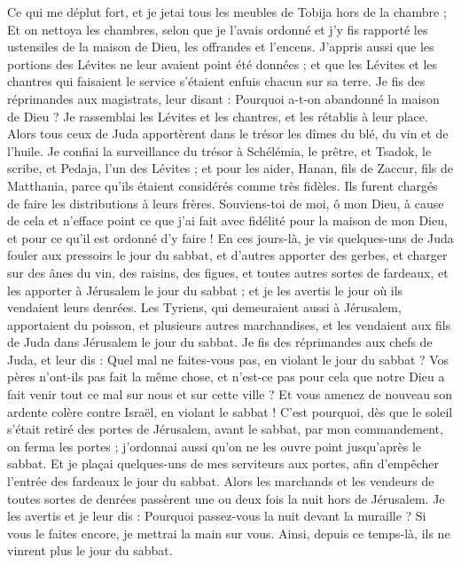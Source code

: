 \begin{multicols}{2}
Ce qui me déplut fort, et je jetai tous les meubles de Tobija hors de la chambre ;
Et on nettoya les chambres, selon que je l'avais ordonné et j'y fis rapporté les ustensiles de la maison de Dieu, les offrandes et l'encens.
J'appris aussi que les portions des Lévites ne leur avaient point été données ; et que les Lévites et les chantres qui faisaient le service s'étaient enfuis chacun sur sa terre.
Je fis des réprimandes aux magistrats, leur disant : Pourquoi a-t-on abandonné la maison de Dieu ? Je rassemblai les Lévites et les chantres, et les rétablis à leur place.
Alors tous ceux de Juda apportèrent dans le trésor les dîmes du blé, du vin et de l'huile.
Je confiai la surveillance du trésor à Schélémia, le prêtre, et Tsadok, le scribe, et Pedaja, l'un des Lévites ; et pour les aider, Hanan, fils de Zaccur, fils de Matthania, parce qu'ils étaient considérés comme très fidèles. Ils furent chargés de faire les distributions à leurs frères.
Souviens-toi de moi, ô mon Dieu, à cause de cela et n'efface point ce que j'ai fait avec fidélité pour la maison de mon Dieu, et pour ce qu'il est ordonné d'y faire !
En ces jours-là, je vis quelques-uns de Juda fouler aux pressoirs le jour du sabbat, et d'autres apporter des gerbes, et charger sur des ânes du vin, des raisins, des figues, et toutes autres sortes de fardeaux, et les apporter à Jérusalem le jour du sabbat ; et je les avertis le jour où ils vendaient leurs denrées.
Les Tyriens, qui demeuraient aussi à Jérusalem, apportaient du poisson, et plusieurs autres marchandises, et les vendaient aux fils de Juda dans Jérusalem le jour du sabbat.
Je fis des réprimandes aux chefs de Juda, et leur dis : Quel mal ne faites-vous pas, en violant le jour du sabbat ?
Vos pères n'ont-ils pas fait la même chose, et n'est-ce pas pour cela que notre Dieu a fait venir tout ce mal sur nous et sur cette ville ? Et vous amenez de nouveau son ardente colère contre Israël, en violant le sabbat !
C'est pourquoi, dès que le soleil s'était retiré des portes de Jérusalem, avant le sabbat, par mon commandement, on ferma les portes ; j'ordonnai aussi qu'on ne les ouvre point jusqu'après le sabbat. Et je plaçai quelques-uns de mes serviteurs aux portes, afin d'empêcher l'entrée des fardeaux le jour du sabbat.
Alors les marchands et les vendeurs de toutes sortes de denrées passèrent une ou deux fois la nuit hors de Jérusalem.
Je les avertis et je leur dis : Pourquoi passez-vous la nuit devant la muraille ? Si vous le faites encore, je mettrai la main sur vous. Ainsi, depuis ce temps-là, ils ne vinrent plus le jour du sabbat.

\end{multicols}
